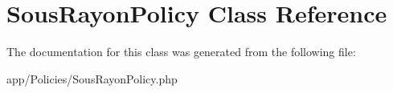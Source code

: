 \hypertarget{class_app_1_1_policies_1_1_sous_rayon_policy}{}\section{Sous\+Rayon\+Policy Class Reference}
\label{class_app_1_1_policies_1_1_sous_rayon_policy}


The documentation for this class was generated from the following file\+:\begin{DoxyCompactItemize}
\item 
app/\+Policies/Sous\+Rayon\+Policy.\+php\end{DoxyCompactItemize}
